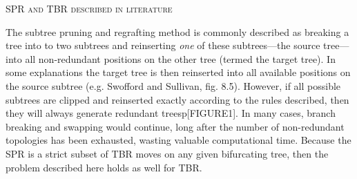 \documentclass[12pt,letterpaper]{article}
\renewcommand{\section}[1]{%
\bigskip
\begin{center}
\begin{Large}
\normalfont\scshape #1
\medskip
\end{Large}
\end{center}}
\renewcommand{\subsection}[1]{%
\bigskip
\begin{center}
\begin{large}
\normalfont\itshape #1
\end{large}
\end{center}}
\begin{document}
\section{SPR and TBR described in literature}



The subtree pruning and regrafting method is commonly described as breaking a tree into to two subtrees and reinserting \textit{one} of these subtrees---the source tree---into all non-redundant positions on the other tree (termed the target tree).
In some explanations the target tree is then reinserted into all available positions on the source subtree (e.g. Swofford and Sullivan, fig. 8.5).
However, if all possible subtrees are clipped and reinserted exactly according to the rules described, then they will always generate redundant treesp[FIGURE1].
In many cases, branch breaking and swapping would continue, long after the number of non-redundant topologies has been exhausted, wasting valuable computational time.
Because the SPR is a strict subset of TBR moves on any given bifurcating tree, then the problem described here holds as well for TBR.
\end{document}
